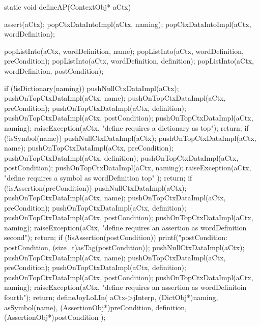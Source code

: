 static void defineAP(ContextObj* aCtx) {
  assert(aCtx);
  popCtxDataIntoImpl(aCtx,    naming);
  popCtxDataIntoImpl(aCtx,    wordDefinition);
  
  popListInto(aCtx, wordDefinition, name);
  popListInto(aCtx, wordDefinition, preCondition);
  popListInto(aCtx, wordDefinition, definition);
  popListInto(aCtx, wordDefinition, postCondition);

  if (!isDictionary(naming)) {
    pushNullCtxDataImpl(aCtx);
    pushOnTopCtxDataImpl(aCtx, name);
    pushOnTopCtxDataImpl(aCtx, preCondition);
    pushOnTopCtxDataImpl(aCtx, definition);
    pushOnTopCtxDataImpl(aCtx, postCondition);
    pushOnTopCtxDataImpl(aCtx, naming);
    raiseException(aCtx,
      "define requires a dictionary as top");
    return;
  }
  if (!isSymbol(name)) {
    pushNullCtxDataImpl(aCtx);
    pushOnTopCtxDataImpl(aCtx, name);
    pushOnTopCtxDataImpl(aCtx, preCondition);
    pushOnTopCtxDataImpl(aCtx, definition);
    pushOnTopCtxDataImpl(aCtx, postCondition);
    pushOnTopCtxDataImpl(aCtx, naming);
    raiseException(aCtx,
      "define requires a symbol as wordDefinition top"
    );
    return;
  }
  if (!isAssertion(preCondition)) {
    pushNullCtxDataImpl(aCtx);
    pushOnTopCtxDataImpl(aCtx, name);
    pushOnTopCtxDataImpl(aCtx, preCondition);
    pushOnTopCtxDataImpl(aCtx, definition);
    pushOnTopCtxDataImpl(aCtx, postCondition);
    pushOnTopCtxDataImpl(aCtx, naming);
    raiseException(aCtx,
      "define requires an assertion as wordDefinition second");
    return;
  }
  if (!isAssertion(postCondition)) {
    printf("postCondition: %
      postCondition, (size_t)asTag(postCondition));
    pushNullCtxDataImpl(aCtx);
    pushOnTopCtxDataImpl(aCtx, name);
    pushOnTopCtxDataImpl(aCtx, preCondition);
    pushOnTopCtxDataImpl(aCtx, definition);
    pushOnTopCtxDataImpl(aCtx, postCondition);
    pushOnTopCtxDataImpl(aCtx, naming);
    raiseException(aCtx,
      "define requires an assertion as wordDefinitoin fourth");
    return;
  }
  defineJoyLoLIn(
    aCtx->jInterp,
    (DictObj*)naming,
    asSymbol(name),
    (AssertionObj*)preCondition,
    definition,
    (AssertionObj*)postCondition
  );
}
\stopCCode

